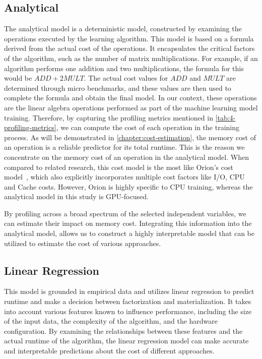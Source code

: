 \subsection{Analytical}
The analytical model is a deterministic model, constructed by examining the operations executed by the learning algorithm. This model is based on a formula derived from the actual cost of the operations. It encapsulates the critical factors of the algorithm, such as the number of matrix multiplications. For example, if an algorithm performs one addition and two multiplications, the formula for this would be $ADD + 2MULT$. The actual cost values for $ADD$ and $MULT$ are determined through micro benchmarks, and these values are then used to complete the formula and obtain the final model. In our context, these operations are the linear algebra operations performed as part of the machine learning model training. Therefore, by capturing the profiling metrics mentioned in \autoref{tab:4-profiling-metrics}, we can compute the cost of each operation in the training process. As will be demonstrated in \autoref{chapter:cost-estimation}, the memory cost of an operation is a reliable predictor for its total runtime. This is the reason we concentrate on the memory cost of an operation in the analytical model. When compared to related research, this cost model is the most like Orion's cost model~\cite{orion_learning_gen_lin_models}, which also explicitly incorporates multiple cost factors like I/O, CPU and Cache costs. However, Orion is highly specific to CPU training, whereas the analytical model in this study is GPU-focused.

By profiling across a broad spectrum of the selected independent variables, we can estimate their impact on memory cost. Integrating this information into the analytical model, allows us to construct a highly interpretable model that can be utilized to estimate the cost of various approaches.

\subsection{Linear Regression}
This model is grounded in empirical data and utilizes linear regression to predict runtime and make a decision between factorization and materialization. It takes into account various features known to influence performance, including the size of the input data, the complexity of the algorithm, and the hardware configuration. By examining the relationships between these features and the actual runtime of the algorithm, the linear regression model can make accurate and interpretable predictions about the cost of different approaches.


